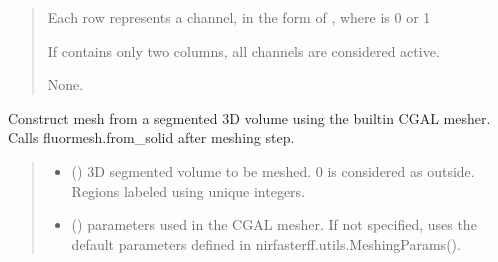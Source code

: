 \documentclass[letterpaper,10pt,english]{sphinxmanual}
\begin{document}
\begin{fulllineitems}
\begin{fulllineitems}
\begin{quote}
\begin{description}
\begin{itemize}
\sphinxAtStartPar
Each row represents a channel, in the form of , where  is 0 or 1

\sphinxAtStartPar
If  contains only two columns, all channels are considered active.


\end{itemize}

\sphinxAtStartPar
None.

\end{description}\end{quote}

\end{fulllineitems}


\begin{fulllineitems}
\label{\detokenize{_autosummary/nirfasterff.base.fluor_mesh.fluormesh:nirfasterff.base.fluor_mesh.fluormesh.from_volume}}
\pysigstartsignatures
{}
\pysigstopsignatures
\sphinxAtStartPar
Construct mesh from a segmented 3D volume using the built\sphinxhyphen{}in CGAL mesher. Calls fluormesh.from\_solid after meshing step.
\begin{quote}\begin{description}
\begin{itemize}
\item {} 
\sphinxAtStartPar
{} () \textendash{} 3D segmented volume to be meshed. 0 is considered as outside. Regions labeled using unique integers.

\item {} 
\sphinxAtStartPar
{} ({\hyperref[\detokenize{_autosummary/nirfasterff.utils.MeshingParams:nirfasterff.utils.MeshingParams}]{}}\sphinxstyleliteralemphasis{\sphinxupquote{, }}) \textendash{} 
\sphinxAtStartPar
parameters used in the CGAL mesher. If not specified, uses the default parameters defined in nirfasterff.utils.MeshingParams().


\end{itemize}
\end{description}
\end{quote}
\end{fulllineitems}
\end{fulllineitems}
\end{document}
